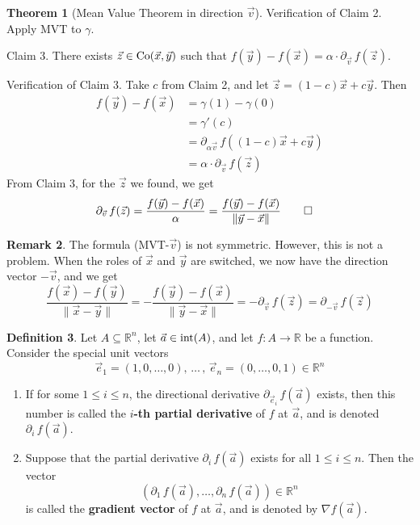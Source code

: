 \documentclass[11pt]{article}
\makeatletter
\theoremstyle{definition}
\newtheorem{thm}{Theorem}[section]
\newtheorem{defn}[thm]{Definition}
\newtheorem{remark}[thm]{Remark}
\newcommand{\R}{\ensuremath{\mathbb{R}}}
\newenvironment{pf}[1][\proofname]{\par
  \pushQED{\qed}%
  \normalfont \topsep0\p@\relax
  \trivlist
  \item[\hskip\labelsep\itshape
  #1\@addpunct{.}]\ignorespaces
}{%
  \popQED\endtrivlist\@endpefalse
}
\makeatother
\begin{document}
\begin{thm}[Mean Value Theorem in direction $\vec{v}$]
\begin{pf}
{\sc Verification of Claim 2.} Apply MVT to $\gamma$.

{\sc Claim 3.} There exists $\vec{z} \in {\rm Co}(\vec{x}, \vec{y})$ such that $f(\vec{y}) - f(\vec{x}) = \alpha \cdot \partial_{\vec{v}}\,f(\vec{z})$.

{\sc Verification of Claim 3.} Take $c$ from Claim 2, and let $\vec{z} = (1-c)\vec{x} + c\vec{y}$. Then
\begin{align*}
    f(\vec{y}) - f(\vec{x}) &= \gamma(1) - \gamma(0) \\
    &= \gamma'(c) \\
    &= \partial_{\alpha\vec{v}}\,f((1-c)\vec{x} + c\vec{y}) \\
    &= \alpha \cdot \partial_{\vec{v}}\,f(\vec{z})
\end{align*}
From Claim 3, for the $\vec{z}$ we found, we get
\begin{align*} \partial_{\vec{v}}\,f(\vec{z}) &= \frac{f(\vec{y}) - f(\vec{x})}\alpha = \frac{f(\vec{y}) - f(\vec{x})}{\|\vec{y} - \vec{x}\|} \hfill \qedhere \end{align*}
\end{pf}
\end{thm}

\begin{remark}
The formula (MVT-$\vec{v}$) is not symmetric. However, this is not a problem. When the roles of $\vec{x}$ and $\vec{y}$ are switched, we now have the direction vector $-\vec{v}$, and we get
$$\frac{f(\vec{x}) - f(\vec{y})}{\|\vec{x} - \vec{y}\|} = -\frac{f(\vec{y}) - f(\vec{x})}{\|\vec{y} - \vec{x}\|} = -\partial_{\vec{v}}\,f(\vec{z}) = \partial_{-\vec{v}}\,f(\vec{z})$$
\end{remark}

\begin{defn}
Let $A \subseteq \R^n$, let $\vec{a} \in {\rm int}(A)$, and let $f : A \to \R$ be a function. Consider the special unit vectors
$$\vec{e}_1 = (1, 0, \dots, 0),\, \dots \,,\, \vec{e}_n = (0, \dots, 0, 1) \in \R^n$$
\vspace{-1.5ex}\begin{enumerate}[(1)]
\item If for some $1 \leq i \leq n$, the directional derivative $\partial_{\vec{e}_i}\,f(\vec{a})$ exists, then this number is called the {\bf $i$-th partial derivative} of $f$ at $\vec{a}$, and is denoted $\partial_i\,f(\vec{a})$.
\item Suppose that the partial derivative $\partial_i\,f(\vec{a})$ exists for all $1 \leq i \leq n$. Then the vector
$$(\partial_1\,f(\vec{a}), \dots, \partial_n\,f(\vec{a})) \in \R^n$$
is called the {\bf gradient vector} of $f$ at $\vec{a}$, and is denoted by $\nabla f(\vec{a})$.
\end{enumerate}\vspace{-1.5ex}
\end{defn}
\end{document}
